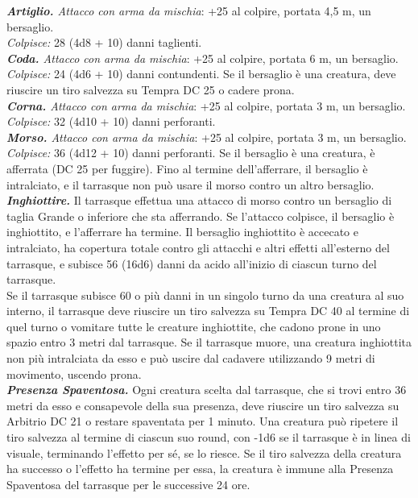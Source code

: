 \begin{multicols}{2}
\emph{\textbf{Artiglio.} Attacco con arma da mischia}: +25 al colpire, portata 4,5 m, un bersaglio.\\
\emph{Colpisce:} 28 (4d8 + 10) danni taglienti. \\
\emph{\textbf{Coda.} Attacco con arma da mischia}: +25 al colpire, portata 6 m, un bersaglio.\\
\emph{Colpisce:} 24 (4d6 + 10) danni contundenti. Se il bersaglio è una creatura, deve riuscire un tiro salvezza su Tempra DC  25 o cadere prona.\\
\emph{\textbf{Corna.} Attacco con arma da mischia}: +25 al colpire, portata 3 m, un bersaglio.\\
\emph{Colpisce:} 32 (4d10 + 10) danni perforanti.\\
\emph{\textbf{Morso.} Attacco con arma da mischia}: +25 al colpire, portata 3 m, un bersaglio.\\
\emph{Colpisce:} 36 (4d12 + 10) danni perforanti. Se il bersaglio è una creatura, è afferrata (DC  25 per fuggire). Fino al termine dell'afferrare, il bersaglio è intralciato, e il tarrasque non può usare il morso contro un altro bersaglio.\\
\emph{\textbf{Inghiottire.}} Il tarrasque effettua una attacco di morso contro un bersaglio di taglia Grande o inferiore che sta afferrando. Se l'attacco colpisce, il bersaglio è inghiottito, e l'afferrare ha termine. Il bersaglio inghiottito è accecato e intralciato, ha copertura totale contro gli attacchi e altri effetti all'esterno del tarrasque, e subisce 56 (16d6) danni da acido all'inizio di ciascun turno del tarrasque.\\
Se il tarrasque subisce 60 o più danni in un singolo turno da una creatura al suo interno, il tarrasque deve riuscire un tiro salvezza su Tempra DC  40 al termine di quel turno o vomitare tutte le creature inghiottite, che cadono prone in uno spazio entro 3 metri dal tarrasque. Se il tarrasque muore, una creatura inghiottita non più intralciata da esso e può uscire dal cadavere utilizzando 9 metri di movimento, uscendo prona.\\
\emph{\textbf{Presenza Spaventosa.}} Ogni creatura scelta dal tarrasque, che si trovi entro 36 metri da esso e consapevole della sua presenza, deve riuscire un tiro salvezza su Arbitrio DC  21 o restare spaventata per 1 minuto. Una creatura può ripetere il tiro salvezza al termine di ciascun suo round, con -1d6 se il tarrasque è in linea di visuale, terminando l'effetto per sé, se lo riesce. Se il tiro salvezza della creatura ha successo o l'effetto ha termine per essa, la creatura è immune alla Presenza Spaventosa del tarrasque per le successive 24 ore.\\

\end{multicols}
